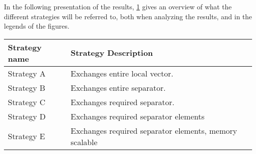 
In the following presentation of the results, \ref{tab:commstratdesc} gives an overview of what the different strategies will be referred to, both when analyzing the results, and in the legends of the figures.

\begin{table}[H]
    \begin{center}
        \begin{tabular}[c]{|p{3cm}|p{5cm}|}
            \hline
             \textbf{Strategy name}& \textbf{Strategy Description}  \\
            \hline
             Strategy A&Exchanges entire local vector.  \\
            \hline
             Strategy B&Exchanges entire separator.  \\
            \hline
             Strategy C&Exchanges required separator.  \\
            \hline
             Strategy D&Exchanges required separator elements  \\
            \hline
             Strategy E&Exchanges required separator elements, memory scalable  \\
            \hline
        \end{tabular}
    \end{center}
    \label{tab:commstratdesc}
\end{table}

